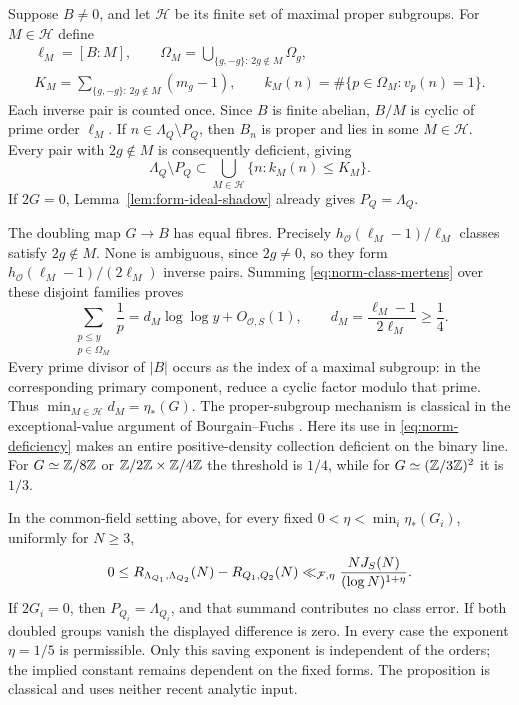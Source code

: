 Suppose $B\ne0$, and let $\mathcal H$ be its finite set of maximal
proper subgroups. For $M\in\mathcal H$ define
\[
 \begin{gathered}
 \ell_M=[B:M],\qquad
 \Omega_M=\bigcup_{\{g,-g\}:\,2g\notin M}\Omega_g,\\
 K_M=\sum_{\{g,-g\}:\,2g\notin M}(m_g-1),\qquad
 k_M(n)=\#\{p\in\Omega_M:v_p(n)=1\}.
 \end{gathered}
\]
Each inverse pair is counted once. Since $B$ is finite abelian,
$B/M$ is cyclic of prime order $\ell_M$. If $n\in\Lambda_Q\setminus P_Q$,
then $B_n$ is proper and lies in some $M\in\mathcal H$. Every pair
with $2g\notin M$ is consequently deficient, giving
\begin{equation}\label{eq:norm-deficiency}
 \Lambda_Q\setminus P_Q\subset
     \bigcup_{M\in\mathcal H}\{n:k_M(n)\le K_M\}.
\end{equation}
If $2G=0$, Lemma~\ref{lem:form-ideal-shadow} already gives $P_Q=\Lambda_Q$.

The doubling map $G\to B$ has equal fibres. Precisely
$h_{\mathcal O}(\ell_M-1)/\ell_M$ classes satisfy $2g\notin M$. None is
ambiguous, since $2g\ne0$, so they form
$h_{\mathcal O}(\ell_M-1)/(2\ell_M)$ inverse pairs. Summing
\eqref{eq:norm-class-mertens} over these disjoint families proves
\begin{equation}\label{eq:norm-maximal-mertens}
 \sum_{\substack{p\le y\\p\in\Omega_M}}\frac1p
     =d_M\log\log y+O_{\mathcal O,S}(1),\qquad
 d_M=\frac{\ell_M-1}{2\ell_M}\ge\frac14.
\end{equation}
Every prime divisor of $|B|$ occurs as the index of a maximal
subgroup: in the corresponding primary component, reduce a cyclic
factor modulo that prime. Thus $\min_{M\in\mathcal H}d_M=\eta_*(G)$.
The proper-subgroup mechanism is classical in the exceptional-value
argument of Bourgain--Fuchs
\cite[Theorem 1, alternative (4.2), and Section 2, part (5)]{bourgainfuchs}.
Here its use in \eqref{eq:norm-deficiency} makes an entire positive-density
collection deficient on the binary line. For $G\simeq\mathbb Z/8\mathbb Z$ or
$\mathbb Z/2\mathbb Z\times\mathbb Z/4\mathbb Z$ the threshold is $1/4$, while for
$G\simeq(\mathbb Z/3\mathbb Z)^2$ it is $1/3$.

\begin{proposition}\label{prop:norm-class-error}
In the common-field setting above, for every fixed
\(0<\eta<\min_i\eta_*(G_i)\), uniformly for \(N\ge3\),
\begin{equation}\label{eq:form-class-error}\csname ltx@label\endcsname{eq:norm-class-error}
 0\le R_{\Lambda_{Q_1},\Lambda_{Q_2}}(N)-R_{Q_1,Q_2}(N)
 \ll_{\mathcal F,\eta}
              \frac{NJ_S(N)}{(\log N)^{1+\eta}}.
\end{equation}
If \(2G_i=0\), then \(P_{Q_i}=\Lambda_{Q_i}\), and that summand
contributes no class error. If both doubled groups vanish the displayed
difference is zero. In every case the exponent \(\eta=1/5\) is
permissible. Only this saving exponent is independent of the orders;
the implied constant remains dependent on the fixed forms.
The proposition is classical and uses neither recent analytic input.
\end{proposition}

